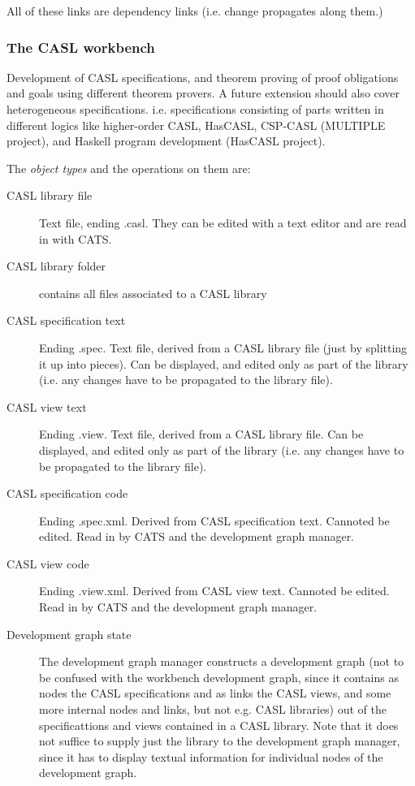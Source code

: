 \documentclass[a4paper]{article}
\begin{document}
All of these links are dependency links (i.e. change propagates along
them.)

\subsubsection{The CASL workbench}

Development of CASL specifications, and theorem proving
of proof obligations and goals using different theorem
provers. A future extension should also cover
heterogeneous specifications. i.e. specifications 
consisting of parts written in different  logics
like higher-order CASL, HasCASL, CSP-CASL
(MULTIPLE project),
and Haskell program development (HasCASL project). 

The {\em object types} and the operations on them are:

\begin{description}
\item[CASL library file]
Text file, ending .casl. They can be edited with a text editor
and are read in with CATS.

\item[CASL library folder]
contains all files associated to a CASL library

\item[CASL specification text] 
Ending .spec.
Text file, derived from a CASL library file
(just by splitting it up into pieces). Can be
displayed, and edited only as part of the library
(i.e. any changes have to be propagated to the library file).

\item[CASL view text] 
Ending .view.
Text file, derived from a CASL library file. Can be
displayed, and edited only as part of the library
(i.e. any changes have to be propagated to the library file).

\item[CASL specification code]
Ending .spec.xml.
Derived from CASL specification text. Cannoted be edited.
Read in by CATS and the development graph manager.

\item[CASL view code]
Ending .view.xml.
Derived from CASL view text. Cannoted be edited.
Read in by CATS and the development graph manager.


\item[Development graph state]
The development graph manager constructs a development graph
(not to be confused with the workbench development graph,
since it contains as nodes the CASL specifications
and as links the CASL views, and some more internal
nodes and links, but not e.g. CASL libraries)
out of the specificattions and views contained in a CASL
library. Note that it does not suffice to supply just
the library to the development graph manager, since
it has to display textual information for individual
nodes of the development graph.


\end{description}
\end{document}
